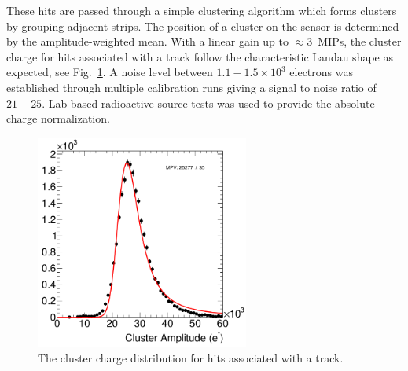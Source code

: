 \documentclass[final,3p,times,twocolumn]{elsarticle}
\begin{document}
These hits are passed through a simple clustering algorithm which forms clusters by grouping adjacent 
strips. The position of a cluster on the sensor is determined by the amplitude-weighted mean.
With a linear gain up to $\approx 3$~MIPs, the cluster charge for hits associated with a track follow 
the characteristic Landau shape as expected, see Fig.~\ref{fig:cluster_pulse}.  
A noise level between $1.1-1.5\times 10^{3}$ electrons was established through multiple calibration 
runs giving a signal to noise ratio of $21-25$. Lab-based radioactive source tests was used to 
provide the absolute charge normalization.
\begin{figure}[]
\begin{center}
{\small
	\includegraphics[width=7cm]{figures/mip_top_layer_2.png}
    	\caption{ The cluster charge distribution for hits associated with a track. }
	\label{fig:cluster_pulse}
}
\end{center}
\end{figure}
\end{document}
